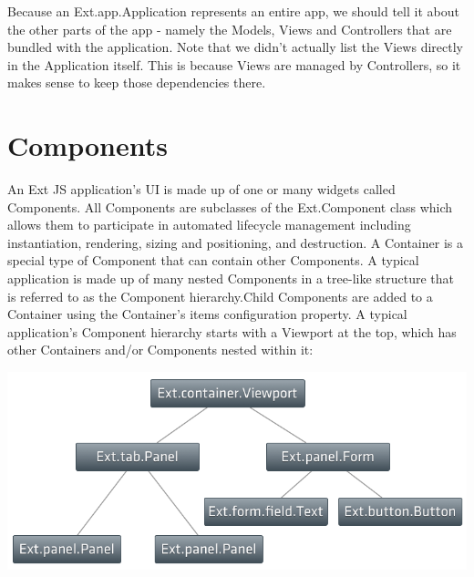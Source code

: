 \par Because an Ext.app.Application represents an entire app, we should tell it about the other parts of the app - namely the Models, Views and Controllers that are bundled with the application. Note that we didn't actually list the Views directly in the Application itself. This is because Views are managed by Controllers, so it makes sense to keep those dependencies there.\\ 

\section{Components}
\par An Ext JS application's UI is made up of one or many widgets called Components. All Components are subclasses of the Ext.Component class which allows them to participate in automated lifecycle management including instantiation, rendering, sizing and positioning, and destruction. 
A Container is a special type of Component that can contain other Components. A typical application is made up of many nested Components in a tree-like structure that is referred to as the Component hierarchy.Child Components are added to a Container using the Container's items configuration property.
 A typical application's Component hierarchy starts with a Viewport at the top, which has other Containers and/or Components nested within it:

\begin{center}
	\includegraphics[width=1.00\textwidth]{img/hierarchy.png}
\end{center}

